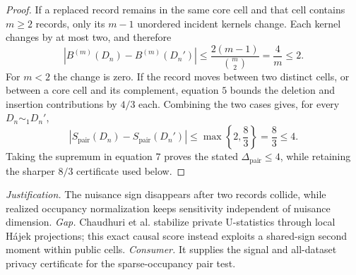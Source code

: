 \documentclass{article}
\begin{document}
\begin{proof}
If a replaced record remains in the same core cell and that cell contains \(m\ge2\) records, only its \(m-1\) unordered incident kernels change.  Each kernel changes by at most two, and therefore
\[
 |B^{(m)}(D_n)-B^{(m)}(D_n')|
 \le\frac{2(m-1)}{\binom m2}=\frac4m\le2. \tag{6}
\]
For \(m<2\) the change is zero.  If the record moves between two distinct cells, or between a core cell and its complement, equation \(5\) bounds the deletion and insertion contributions by \(4/3\) each.  Combining the two cases gives, for every \(D_n\sim_1D_n'\),
\[
 |S_{\mathrm{pair}}(D_n)-S_{\mathrm{pair}}(D_n')|
 \le\max\left\{2,\frac83\right\}=\frac83\le4. \tag{7}
\]
Taking the supremum in equation \(7\) proves the stated \(\Delta_{\mathrm{pair}}\le4\), while retaining the sharper \(8/3\) certificate used below.
\end{proof}
\par\smallskip\noindent \textit{Justification.} The nuisance sign disappears after two records collide, while realized occupancy normalization keeps sensitivity independent of nuisance dimension. \textit{Gap.} Chaudhuri et al. stabilize private U-statistics through local Hájek projections; this exact causal score instead exploits a shared-sign second moment within public cells. \textit{Consumer.} It supplies the signal and all-dataset privacy certificate for the sparse-occupancy pair test.
\end{document}
